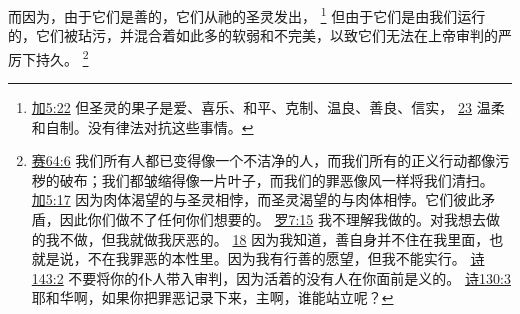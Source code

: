 \documentclass[12pt, a4paper, oneside]{ctexart}
\begin{document}
	而因为，由于它们是善的，它们从祂的圣灵发出，
	\footnote {
		\href{https://biblehub.com/galatians/5-22.htm}{加5:22} 但圣灵的果子是爱、喜乐、和平、克制、温良、善良、信实，
		\href{https://biblehub.com/galatians/5-23.htm}{23} 温柔和自制。没有律法对抗这些事情。
	}
	但由于它们是由我们运行的，它们被玷污，并混合着如此多的软弱和不完美，以致它们无法在上帝审判的严厉下持久。
	\footnote {
		\href{https://biblehub.com/isaiah/64-6.htm}{赛64:6} 我们所有人都已变得像一个不洁净的人，而我们所有的正义行动都像污秽的破布；我们都皱缩得像一片叶子，而我们的罪恶像风一样将我们清扫。
		\href{https://biblehub.com/galatians/5-17.htm}{加5:17} 因为肉体渴望的与圣灵相悖，而圣灵渴望的与肉体相悖。它们彼此矛盾，因此你们做不了任何你们想要的。 
		\href{https://biblehub.com/romans/7-15.htm}{罗7:15} 我不理解我做的。对我想去做的我不做，但我就做我厌恶的。
		\href{https://biblehub.com/romans/7-18.htm}{18} 因为我知道，善自身并不住在我里面，也就是说，不在我罪恶的本性里。因为我有行善的愿望，但我不能实行。
		\href{https://biblehub.com/psalms/143-2.htm}{诗143:2} 不要将你的仆人带入审判，因为活着的没有人在你面前是义的。
		\href{https://biblehub.com/psalms/130-3.htm}{诗130:3} 耶和华啊，如果你把罪恶记录下来，主啊，谁能站立呢？
	}
\end{document}
